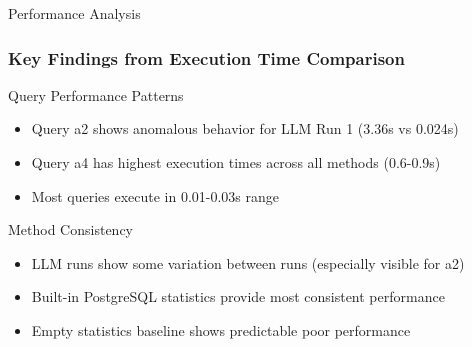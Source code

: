 \documentclass{beamer}
\begin{document}
\begin{frame}{Performance Analysis}
\frametitle{Key Findings from Execution Time Comparison}

\begin{block}{Query Performance Patterns}
\begin{itemize}
    \item Query a2 shows anomalous behavior for LLM Run 1 (3.36s vs 0.024s)
    \item Query a4 has highest execution times across all methods (0.6-0.9s)
    \item Most queries execute in 0.01-0.03s range
\end{itemize}
\end{block}

\begin{block}{Method Consistency}
\begin{itemize}
    \item LLM runs show some variation between runs (especially visible for a2)
    \item Built-in PostgreSQL statistics provide most consistent performance
    \item Empty statistics baseline shows predictable poor performance
\end{itemize}
\end{block}

\end{frame}
\end{document}
